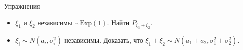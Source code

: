 Упражнения

\begin{itemize}
 \item $ \xi_1 $ и $ \xi_2 $ независимы $ \sim \mathrm{Exp}(1)$. Найти $ P_{\xi_1 + \xi_2} $.
 \item $ \xi_i \sim N(a_i,\sigma_i^{2}) $ независимы. Доказать, что $ \xi_1 + \xi_2 \sim N(a_1 + a_2, \sigma_1^{2} + \sigma_2^{2}) $.
\end{itemize}

